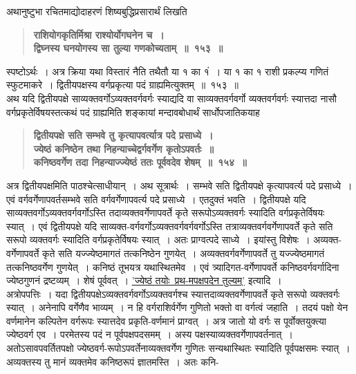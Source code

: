 \documentclass[11pt, openany]{book}
\begin{document}
\newpage

\begin{sloppypar}
{\small अथानुष्टुभा रचितमाद्योदाहरणं शिष्यबुद्धिप्रसारार्थं लिखति\textendash }

 \label{10.153}
\begin{quote}
{\large \textbf{{\color{purple}राशियोगकृतिर्मिश्रा राश्योर्योगघनेन च~।\\
द्विघ्नस्य घनयोगस्य सा तुल्या गणकोच्यताम्~॥~१५३~॥}}}
\end{quote}

स्पष्टोऽर्थः~। अत्र क्रिया यथा विस्तारं नैति तथैतौ या १ का १ं~। या १ का १ राशी प्रकल्प्य गणितं स्फुटमाकरे~। द्वितीयपक्षस्य वर्गप्रकृत्या पदं ग्राह्यमित्युक्तम्~॥~१५३~॥\\

{\small अथ यदि द्वितीयपक्षे साव्यक्तवर्गोऽव्यक्तवर्गवर्गः स्याद्यदि वा साव्यक्तवर्गवर्गो व्यक्तवर्गवर्गः स्यात्तदा नासौ वर्गप्रकृतेर्विषयस्तत्कथं पदं ग्राह्यमिति शङ्कायां मन्दावबोधार्थं सार्धोपजातिकयाह\textendash }

 \label{10.154}
\begin{quote}
{\large \textbf{{\color{purple}द्वितीयपक्षे सति सम्भवे तु कृत्यापवर्त्यात्र पदे प्रसाध्ये~।\\
ज्येष्ठं कनिष्ठेन तथा निहन्याच्चेद्वर्गवर्गेण कृतोऽपवर्तः~॥\\
कनिष्ठवर्गेण तदा निहन्याज्ज्येष्ठं ततः पूर्ववदेव शेषम्~॥~१५४~॥}}}
\end{quote}

अत्र द्वितीयपक्षमिति पाठश्चेत्साधीयान्~। अथ सूत्रार्थः~। सम्भवे सति द्वितीयपक्षे कृत्यापवर्त्य पदे प्रसाध्ये~। एवं वर्गवर्गेणापवर्तसम्भवे सति वर्गवर्गेणापवर्त्य पदे प्रसाध्ये~। एतदुक्तं भवति~। द्वितीयपक्षे यदि साव्यक्तवर्गोऽव्यक्तवर्गवर्गोऽस्ति तदाव्यक्तवर्गेणापवर्ते कृते सरूपोऽव्यक्तवर्गः स्यादिति वर्गप्रकृतेर्विषयः स्यात्~। एवं द्वितीयपक्षे यदि साव्यक्त-वर्गवर्गोऽव्यक्तवर्गवर्गवर्गोऽस्ति तत्राव्यक्तवर्गवर्गेणापवर्ते कृते सति सरूपो व्यक्तवर्गः स्यादिति वर्गप्रकृतेर्विषयः स्यात्~। अतः प्राग्वत्पदे साध्ये~। इयांस्तु विशेषः~। अव्यक्त-वर्गेणापवर्ते कृते सति यज्ज्येष्ठमागतं तत्कनिष्ठेन गुणयेत्~। अव्यक्तवर्गवर्गेणापवर्ते तु यज्ज्येष्ठमागतं तत्कनिष्ठवर्गेण गुणयेत्~। कनिष्ठं तूभयत्र यथास्थितमेव~। एवं त्र्यादिगत-वर्गेणापवर्ते कनिष्ठवर्गवर्गादिना ज्येष्ठगुणनं द्रष्टव्यम्~। शेषं पूर्ववत्~। \hyperref[10.151]{'ज्येष्ठं तयोः~प्रथ-मपक्षपदेन तुल्यम्'} इत्यादि~।\\

अत्रोपपत्तिः~। यदा द्वितीयपक्षेऽव्यक्तवर्गवर्गोऽव्यक्तवर्गश्च स्यात्तदाव्यक्तवर्गेणापवर्ते कृते सरूपो व्यक्तवर्गः स्यात्~। अनेनापि वर्गेणैव भाव्यम्~। न हि वर्गराशिर्वर्गेण गुणितो भक्तो वा वर्गत्वं जहाति~। तदयं पक्षो येन वर्णमानेन कल्पितेन वर्गरूपः स्यात्तदेव प्रकृति-वर्णमानं प्राग्वत्~। अत्र जातो यो वर्गः स पूर्वोक्तयुक्त्या ज्येष्ठवर्ग एव~। परमेतस्य पदं न पूर्वपक्षपदसमम्~। अस्य पक्षस्याव्यक्तवर्गेणापवर्तनात्~। अतोऽसावपवर्तितपक्षो ज्येष्ठवर्ग-रूपोऽपवर्तेनाव्यक्तवर्गेण गुणितः सन्यथास्थितः स्यादिति पूर्वपक्षसमः स्यात्~। अव्यक्तस्य तु मानं व्यक्तमेव कनिष्ठरूपं ज्ञातमस्ति~। अतः कनि-
\end{sloppypar}
\end{document}
